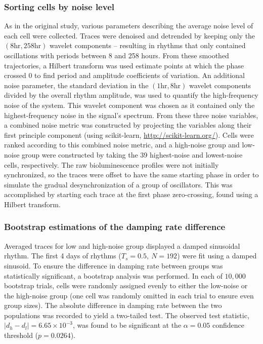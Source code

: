 \documentclass[11pt, letterpaper]{article}
\begin{document}
\subsubsection*{Sorting cells by noise level}
As in the original study, various parameters describing the average noise level of each cell were collected.
Traces were denoised and detrended by keeping only the $(8 \text{hr}, 258 \text{hr})$ wavelet components -- resulting in rhythms that only contained oscillations with periods between 8 and 258 hours.
From these smoothed trajectories, a Hilbert transform was used estimate points at which the phase crossed $0$ to find period and amplitude coefficients of variation.
An additional noise parameter, the standard deviation in the $(1 \text{hr}, 8 \text{hr})$ wavelet components divided by the overall rhythm amplitude, was used to quantify the high-frequency noise of the system.
This wavelet component was chosen as it contained only the highest-frequency noise in the signal's spectrum.
From these three noise variables, a combined noise metric was constructed by projecting the variables along their first principle component (using scikit-learn, \url{http://scikit-learn.org/}).
Cells were ranked according to this combined noise metric, and a high-noise group and low-noise group were constructed by taking the 39 highest-noise and lowest-noise cells, respectively.
The raw bioluminescence profiles were not initially synchronized, so the traces were offset to have the same starting phase in order to simulate the gradual desynchronization of a group of oscillators. 
This was accomplished by starting each trace at the first phase zero-crossing, found using a Hilbert transform.

\subsubsection*{Bootstrap estimations of the damping rate difference}
Averaged traces for low and high-noise group displayed a damped sinusoidal rhythm.
The first 4 days of rhythms ($T_s = 0.5,\ N = 192$) were fit using a damped sinusoid.
To ensure the difference in damping rate between groups was statistically significant, a bootstrap analysis was performed.
In each of $10,000$ bootstrap trials, cells were randomly assigned evenly to either the low-noise or the high-noise group (one cell was randomly omitted in each trial to ensure even group sizes).
The absolute difference in damping rate between the two populations was recorded to yield a two-tailed test.
The observed test statistic, $|d_h - d_l| = 6.65\times10^{-3}$, was found to be significant at the $\alpha = 0.05$ confidence threshold ($p = 0.0264$).
\end{document}
